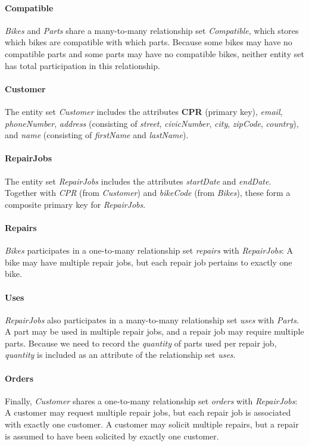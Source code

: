 \documentclass[dtu]{dtuarticle}
\begin{document}
\paragraph{Compatible}
\textit{Bikes} and \textit{Parts} share a many-to-many relationship set \textit{Compatible}, which stores which bikes are compatible with which parts. Because some bikes may have no compatible parts and some parts may have no compatible bikes, neither entity set has total participation in this relationship.

\paragraph{Customer}
The entity set \textit{Customer} includes the attributes \textbf{CPR} (primary key), \textit{email}, \textit{phoneNumber}, \textit{address} (consisting of \textit{street}, \textit{civicNumber}, \textit{city}, \textit{zipCode}, \textit{country}), and \textit{name} (consisting of \textit{firstName} and \textit{lastName}).

\paragraph{RepairJobs}
The entity set \textit{RepairJobs} includes the attributes \textit{startDate} and \textit{endDate}. Together with \textit{CPR} (from \textit{Customer}) and \textit{bikeCode} (from \textit{Bikes}), these form a composite primary key for \textit{RepairJobs}.

\paragraph{Repairs}
\textit{Bikes} participates in a one-to-many relationship set \textit{repairs} with \textit{RepairJobs}: A bike may have multiple repair jobs, but each repair job pertains to exactly one bike.

\paragraph{Uses}
\textit{RepairJobs} also participates in a many-to-many relationship set \textit{uses} with \textit{Parts}. A part may be used in multiple repair jobs, and a repair job may require multiple parts. Because we need to record the \textit{quantity} of parts used per repair job, \textit{quantity} is included as an attribute of the relationship set \textit{uses}.

\paragraph{Orders}
Finally, \textit{Customer} shares a one-to-many relationship set \textit{orders} with \textit{RepairJobs}: A customer may request multiple repair jobs, but each repair job is associated with exactly one customer. A customer may solicit multiple repairs, but a repair is assumed to have been solicited by exactly one customer.
\end{document}
